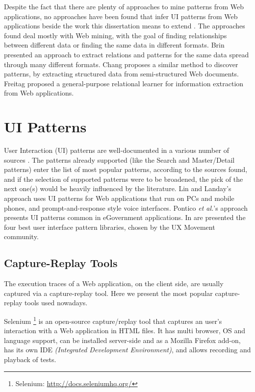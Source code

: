 Despite the fact that there are plenty of approaches to mine patterns from Web applications, no approaches have been found that infer UI patterns from Web applications beside the work this dissertation means to extend \cite{nabuco2013inferring, morgado2012gui}. The approaches found deal mostly with Web mining, with the goal of finding relationships between different data or finding the same data in different formats. Brin \cite{brin1999extracting} presented an approach to extract relations and patterns for the same data spread through many different formats. Chang \cite{chang2003automatic} proposes a similar method to discover patterns, by extracting structured data from semi-structured Web documents. Freitag \cite{freitag1998information} proposed a general-purpose relational learner for information extraction from Web applications.

\section{UI Patterns}\label{sec:patterns}

User Interaction (UI) patterns are well-documented in a various number of sources \cite{tidwell2010designing, van2001patterns, neil12standard, sinnig2005patterns}. The patterns already supported (like the Search and Master/Detail patterns) enter the list of most popular patterns, according to the sources found, and if the selection of supported patterns were to be broadened, the pick of the next one(s) would be heavily influenced by the literature. Lin and Landay's approach \cite{lin2008employing} uses UI patterns for Web applications that run on PCs and mobile phones, and prompt-and-response style voice interfaces. Pontico \textit{et al.}'s approach \cite{pontico2008organizing} presents UI patterns common in eGovernment applications. In \cite{4bestlibs} are presented the four best user interface pattern libraries, chosen by the UX Movement community.

\subsection{Capture-Replay Tools}

The execution traces of a Web application, on the client side, are usually captured via a capture-replay tool. Here we present the most popular capture-replay tools used nowadays.

Selenium \footnote{Selenium: \url{http://docs.seleniumhq.org/}} is an open-source capture/replay tool that captures an user's interaction with a Web application in HTML files. It has multi browser, OS and language support, can be installed server-side and as a Mozilla Firefox add-on, has its own IDE \textit{(Integrated Development Environment)}, and allows recording and playback of tests.

